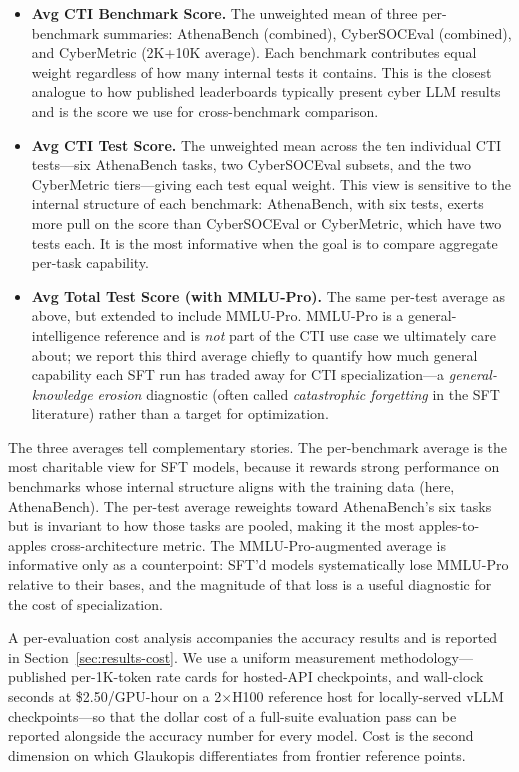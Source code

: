 \documentclass[conference]{IEEEtran}
\begin{document}
\begin{itemize}
  \item \textbf{Avg CTI Benchmark Score.} The unweighted mean of three per-benchmark summaries: AthenaBench (combined), CyberSOCEval (combined), and CyberMetric (2K+10K average). Each benchmark contributes equal weight regardless of how many internal tests it contains. This is the closest analogue to how published leaderboards typically present cyber LLM results and is the score we use for cross-benchmark comparison.
  \item \textbf{Avg CTI Test Score.} The unweighted mean across the ten individual CTI tests---six AthenaBench tasks, two CyberSOCEval subsets, and the two CyberMetric tiers---giving each test equal weight. This view is sensitive to the internal structure of each benchmark: AthenaBench, with six tests, exerts more pull on the score than CyberSOCEval or CyberMetric, which have two tests each. It is the most informative when the goal is to compare aggregate per-task capability.
  \item \textbf{Avg Total Test Score (with MMLU-Pro).} The same per-test average as above, but extended to include MMLU-Pro. MMLU-Pro is a general-intelligence reference and is \emph{not} part of the CTI use case we ultimately care about; we report this third average chiefly to quantify how much general capability each SFT run has traded away for CTI specialization---a \textit{general-knowledge erosion} diagnostic (often called \textit{catastrophic forgetting} in the SFT literature) rather than a target for optimization.
\end{itemize}

The three averages tell complementary stories. The per-benchmark average is the most charitable view for SFT models, because it rewards strong performance on benchmarks whose internal structure aligns with the training data (here, AthenaBench). The per-test average reweights toward AthenaBench's six tasks but is invariant to how those tasks are pooled, making it the most apples-to-apples cross-architecture metric. The MMLU-Pro-augmented average is informative only as a counterpoint: SFT'd models systematically lose MMLU-Pro relative to their bases, and the magnitude of that loss is a useful diagnostic for the cost of specialization.

A per-evaluation cost analysis accompanies the accuracy results and is reported in Section~\ref{sec:results-cost}. We use a uniform measurement methodology---published per-1K-token rate cards for hosted-API checkpoints, and wall-clock seconds at \$2.50/GPU-hour on a 2$\times$H100 reference host for locally-served vLLM checkpoints---so that the dollar cost of a full-suite evaluation pass can be reported alongside the accuracy number for every model. Cost is the second dimension on which Glaukopis differentiates from frontier reference points.
\end{document}
